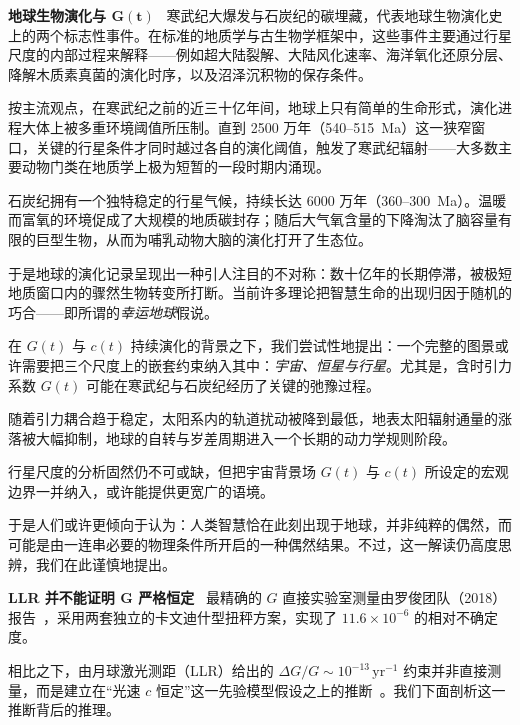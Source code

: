 \documentclass[12pt,leqno]{article}
\begin{document}
	
	
	
	
	\medskip
	\bigskip
	\textbf{地球生物演化与 $\boldsymbol{G(t)}$}\,\,\,
	寒武纪大爆发与石炭纪的碳埋藏，代表地球生物演化史上的两个标志性事件。在标准的地质学与古生物学框架中，这些事件主要通过行星尺度的内部过程来解释——例如超大陆裂解、大陆风化速率、海洋氧化还原分层、降解木质素真菌的演化时序，以及沼泽沉积物的保存条件。
	
	\medskip
	按主流观点，在寒武纪之前的近三十亿年间，地球上只有简单的生命形式，演化进程大体上被多重环境阈值所压制。直到 2500 万年（540--515~Ma）这一狭窄窗口，关键的行星条件才同时越过各自的演化阈值，触发了寒武纪辐射——大多数主要动物门类在地质学上极为短暂的一段时期内涌现。
	
	\medskip
	石炭纪拥有一个独特稳定的行星气候，持续长达 6000 万年（360--300~Ma）。温暖而富氧的环境促成了大规模的地质碳封存；随后大气氧含量的下降淘汰了脑容量有限的巨型生物，从而为哺乳动物大脑的演化打开了生态位。
	
	\medskip
	于是地球的演化记录呈现出一种引人注目的不对称：数十亿年的长期停滞，被极短地质窗口内的骤然生物转变所打断。当前许多理论把智慧生命的出现归因于随机的巧合——即所谓的{\textit{幸运地球}}假说。
	
	\medskip
	在 $G(t)$ 与 $c(t)$ 持续演化的背景之下，我们尝试性地提出：一个完整的图景或许需要把三个尺度上的嵌套约束纳入其中：{\textit{宇宙、恒星与行星}}。尤其是，含时引力系数 $G(t)$ 可能在寒武纪与石炭纪经历了关键的弛豫过程。 
	
	\medskip
	随着引力耦合趋于稳定，太阳系内的轨道扰动被降到最低，地表太阳辐射通量的涨落被大幅抑制，地球的自转与岁差周期进入一个长期的动力学规则阶段。
	
	\medskip
	行星尺度的分析固然仍不可或缺，但把宇宙背景场 $G(t)$ 与 $c(t)$ 所设定的宏观边界一并纳入，或许能提供更宽广的语境。 
	
	\medskip
	于是人们或许更倾向于认为：人类智慧恰在此刻出现于地球，并非纯粹的偶然，而可能是由一连串必要的物理条件所开启的一种偶然结果。不过，这一解读仍高度思辨，我们在此谨慎地提出。
	
	
	
	\medskip
	\bigskip
	\textbf{LLR 并不能证明 $\boldsymbol{G}$ 严格恒定}\,\,\,
	最精确的 $G$ 直接实验室测量由罗俊团队（2018）报告~\cite{Luo:2018}，采用两套独立的卡文迪什型扭秤方案，实现了 $11.6\times 10^{-6}$ 的相对不确定度。 
	
	\medskip
	相比之下，由月球激光测距（LLR）给出的 $\Delta G/G \sim 10^{-13}\,\mathrm{yr}^{-1}$ 约束并非直接测量，而是建立在“光速 $c$ 恒定”这一先验模型假设之上的推断~\cite{Mueller:2014}。我们下面剖析这一推断背后的推理。
	
\end{document}
